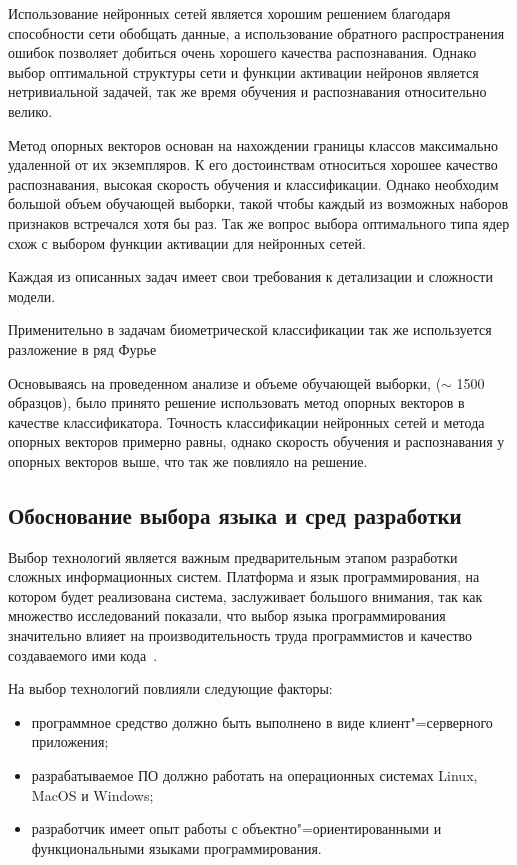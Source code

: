 Использование нейронных сетей является хорошим решением благодаря способности сети обобщать данные, а использование обратного распространения ошибок позволяет добиться очень хорошего качества распознавания. Однако выбор оптимальной структуры сети и функции активации нейронов является нетривиальной задачей, так же время обучения и распознавания относительно велико.

Метод опорных векторов основан на нахождении границы классов максимально удаленной от их экземпляров. К его достоинствам относиться хорошее качество распознавания, высокая скорость обучения и классификации. Однако необходим большой объем обучающей выборки, такой чтобы каждый из возможных наборов признаков встречался хотя бы раз. Так же вопрос выбора оптимального типа ядер схож с выбором функции активации для нейронных сетей.

Каждая из описанных задач имеет свои требования к детализации и сложности модели.


Применительно в задачам биометрической классификации так же используется разложение в ряд Фурье

Основываясь на проведенном анализе и объеме обучающей выборки, ($\sim$ 1500 образцов), было принято решение использовать метод опорных векторов в качестве классификатора. Точность классификации нейронных сетей и метода опорных векторов примерно равны, однако скорость обучения и распознавания у опорных векторов выше, что так же повлияло на решение.

\subsection{Обоснование выбора языка и сред разработки}
\label{sec:techs:intro}
Выбор технологий является важным предварительным этапом разработки сложных информационных систем. Платформа и язык программирования, на котором будет реализована система, заслуживает большого внимания, так как множество исследований показали, что выбор языка программирования значительно влияет на производительность труда программистов и качество создаваемого ими кода~\cite[c.~59]{mcconnell_2005}.

На выбор технологий повлияли следующие факторы:
\begin{itemize}
  \item программное средство должно быть выполнено в виде клиент"=серверного приложения;
  \item разрабатываемое ПО должно работать на операционных системах Linux, MacOS и Windows;
  \item разработчик имеет опыт работы с объектно"=ориентированными и функциональными языками программирования.
\end{itemize}


